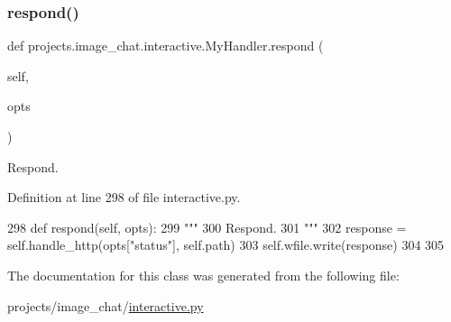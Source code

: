 \subsubsection{\texorpdfstring{respond()}{respond()}}
{\footnotesize\ttfamily def projects.\+image\+\_\+chat.\+interactive.\+My\+Handler.\+respond (\begin{DoxyParamCaption}\item[{}]{self,  }\item[{}]{opts }\end{DoxyParamCaption})}

\begin{DoxyVerb}Respond.
\end{DoxyVerb}
 

Definition at line 298 of file interactive.\+py.


\begin{DoxyCode}
298     \textcolor{keyword}{def }respond(self, opts):
299         \textcolor{stringliteral}{"""}
300 \textcolor{stringliteral}{        Respond.}
301 \textcolor{stringliteral}{        """}
302         response = self.handle\_http(opts[\textcolor{stringliteral}{"status"}], self.path)
303         self.wfile.write(response)
304 
305 
\end{DoxyCode}


The documentation for this class was generated from the following file\+:\begin{DoxyCompactItemize}
\item 
projects/image\+\_\+chat/\hyperlink{projects_2image__chat_2interactive_8py}{interactive.\+py}\end{DoxyCompactItemize}
